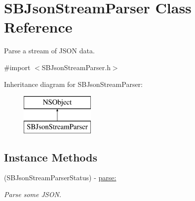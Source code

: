 \hypertarget{interface_s_b_json_stream_parser}{\section{S\-B\-Json\-Stream\-Parser Class Reference}
\label{interface_s_b_json_stream_parser}
}


Parse a stream of J\-S\-O\-N data.  




{\ttfamily \#import $<$S\-B\-Json\-Stream\-Parser.\-h$>$}

Inheritance diagram for S\-B\-Json\-Stream\-Parser\-:\begin{figure}[H]
\begin{center}
\leavevmode
\includegraphics[height=2.000000cm]{interface_s_b_json_stream_parser}
\end{center}
\end{figure}
\subsection*{Instance Methods}
\begin{DoxyCompactItemize}
\item 
(S\-B\-Json\-Stream\-Parser\-Status) -\/ \hyperlink{interface_s_b_json_stream_parser_a9c4b15221e738a1eb49079e266daa1bf}{parse\-:}
\begin{DoxyCompactList}\small\item\em Parse some J\-S\-O\-N. \end{DoxyCompactList}\end{DoxyCompactItemize}
